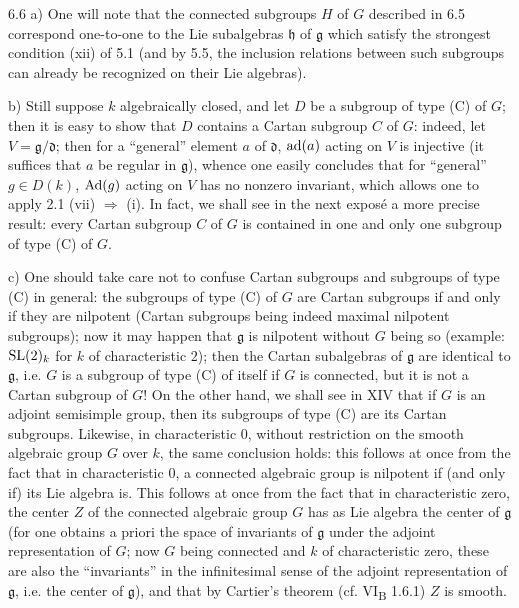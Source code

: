 \begin{remarks}{6.6}\label{XIII.6.6}
\noindent a) One will note that the connected subgroups
$H$ of $G$ described in 6.5 correspond one-to-one to
the Lie subalgebras $\mathfrak h$ of $\mathfrak g$
which satisfy the strongest condition (xii) of 5.1
(and by 5.5, the inclusion relations between such
subgroups can already be recognized on their Lie algebras).

\noindent b) Still suppose $k$ algebraically closed,
and let $D$ be a subgroup of type (C) of $G$; then
it is easy to show that $D$ contains a Cartan subgroup
$C$ of $G$: indeed, let $V=\mathfrak g/\mathfrak d$;
then for a ``general'' element $a$ of $\mathfrak d$,
$\operatorname{ad}(a)$ acting on $V$ is injective (it suffices that
$a$ be regular in $\mathfrak g$), whence one easily
concludes that for ``general'' $g\in D(k)$,
$\operatorname{Ad}(g)$ acting on $V$ has no nonzero invariant,
which allows one to apply 2.1 (vii) $\Rightarrow$ (i).
In fact, we shall see in the next expos\'e a more
precise result: every Cartan subgroup $C$ of $G$
is contained in one and only one subgroup of type
(C) of $G$.

\noindent c) One should take care not to confuse
Cartan subgroups and subgroups of type (C) in general:
the subgroups of type (C) of $G$ are Cartan subgroups
if and only if they are nilpotent (Cartan subgroups
being indeed maximal nilpotent subgroups); now it
may happen that $\mathfrak g$ is nilpotent without
$G$ being so (example: $\operatorname{SL}(2)_k$ for $k$ of
characteristic $2$); then the Cartan subalgebras
of $\mathfrak g$ are identical to $\mathfrak g$,
i.e. $G$ is a subgroup of type (C) of itself if
$G$ is connected, but it is not a Cartan subgroup
of $G$! On the other hand, we shall see in XIV
that if $G$ is an adjoint semisimple group, then
its subgroups of type (C) are its Cartan subgroups.
Likewise, in characteristic $0$, without restriction
on the smooth algebraic group $G$ over $k$, the
same conclusion holds: this follows at once from
the fact that in characteristic $0$, a connected
algebraic group is nilpotent if (and only if) its
Lie algebra is. This follows at once from the fact
that in characteristic zero, the center $Z$ of
the connected algebraic group $G$ has as Lie algebra
the center of $\mathfrak g$ (for one obtains a priori
the space of invariants of $\mathfrak g$ under the
adjoint representation of $G$; now $G$ being connected
and $k$ of characteristic zero, these are also the
``invariants'' in the infinitesimal sense of the
adjoint representation of $\mathfrak g$, i.e. the
center of $\mathfrak g$), and that by Cartier's
theorem (cf. VI\textsubscript{B} 1.6.1) $Z$ is smooth.
\end{remarks}
